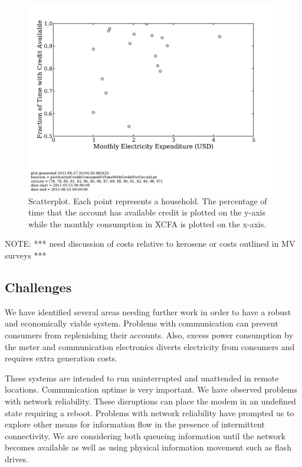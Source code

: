 \documentclass[conference]{IEEEtran}
\newcommand{\note}[1]{{\color{red} NOTE: *** #1 ***}}
\begin{document}
\begin{figure}[]
\begin{center}
\includegraphics[trim = 0in 1.3in 0in 0in, clip, width=\columnwidth]
                {figures/scatterCreditTime.pdf}
\end{center}
\caption{Scatterplot.  Each point represents a household.  The percentage
of time that the account has available credit is plotted on the y-axis while
the monthly consumption in XCFA is plotted on the x-axis.}
\label{scatterCreditTime}
\end{figure}

\note{need discussion of costs relative to kerosene or costs outlined in 
MV surveys}

\subsection{Challenges}
We have identified several areas needing further work in order to have 
a robust and economically viable system.  Problems with communication
can prevent consumers from replenishing their accounts.  Also, excess
power consumption by the meter and communication electronics diverts 
electricity from consumers and requires extra generation costs.

These systems are intended to run uninterrupted and unattended in 
remote locations.  Communication uptime is very important.  We have 
observed problems with network reliability.  These disruptions can
place the modem in an undefined state requiring a reboot.  
Problems with network reliability have prompted us to explore other 
means for information flow in the presence of intermittent connectivity.
We are considering both queueing information until the network becomes
available as well as using physical information movement such as flash
drives.
\end{document}
